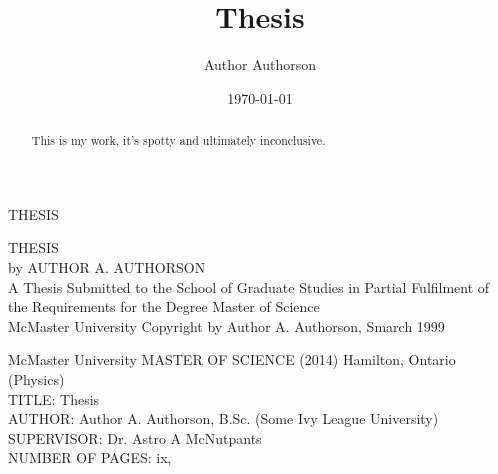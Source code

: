 \documentclass[12pt, letterpaper, twoside, openright]{report}
\title{Thesis}
\author{Author Authorson}
\date{\today}
\begin{document}

\begin{titlepage}
    \thispagestyle{empty}
    \vspace*{\fill}
    \begin{center}{\Large
    \uppercase{Thesis}}
    \end{center}
    \vspace*{\fill}
    \setcounter{page}{0}
\end{titlepage}


\begin{titlepage}
    \thispagestyle{empty}
    \vspace*{\fill}
    \begin{center}{\Large
    \uppercase{Thesis}\\
    \vfill
    by AUTHOR A. AUTHORSON}\\
    \vfill
    {\normalsize A Thesis Submitted to the School of Graduate Studies in Partial Fulfilment of the Requirements for the Degree Master of Science}\\
    \vfill
    {\normalsize McMaster University \textcopyright{} Copyright by Author A. Authorson, Smarch 1999}
    \end{center}
\end{titlepage}


{\noindent McMaster University MASTER OF SCIENCE (2014) Hamilton, Ontario (Physics)\\
TITLE: Thesis\\
AUTHOR: Author A. Authorson, B.Sc. (Some Ivy League University)\\
SUPERVISOR: Dr. Astro A McNutpants\\
NUMBER OF PAGES: ix,~\pageref{LastPage}}


\begin{abstract}
    \thispagestyle{plain}
    \setcounter{page}{3}
    This is my work, it's spotty and ultimately inconclusive.
\end{abstract}

\end{document}
